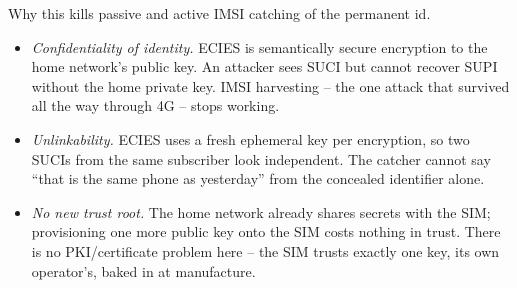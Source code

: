 \begin{whybox}
Why this kills passive and active IMSI catching of the permanent id.
\begin{itemize}
  \item \emph{Confidentiality of identity.} ECIES is semantically secure encryption to the home network's public key. An attacker sees SUCI but cannot recover SUPI without the home private key. IMSI harvesting -- the one attack that survived all the way through 4G -- stops working.
  \item \emph{Unlinkability.} ECIES uses a fresh ephemeral key per encryption, so two SUCIs from the same subscriber look independent. The catcher cannot say ``that is the same phone as yesterday'' from the concealed identifier alone.
  \item \emph{No new trust root.} The home network already shares secrets with the SIM; provisioning one more public key onto the SIM costs nothing in trust. There is no PKI/certificate problem here -- the SIM trusts exactly one key, its own operator's, baked in at manufacture.
\end{itemize}
\end{whybox}

